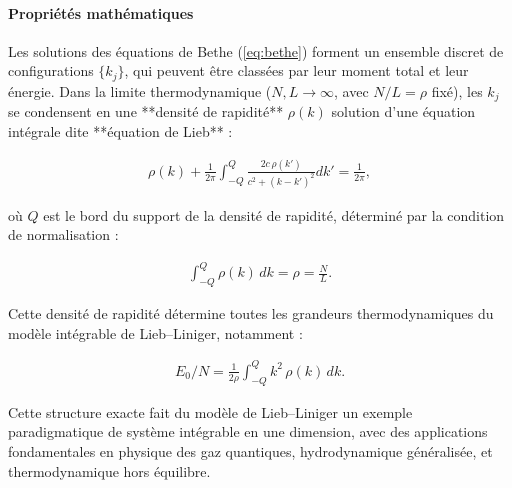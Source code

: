 \paragraph{Propriétés mathématiques}

Les solutions des équations de Bethe (\ref{eq:bethe}) forment un ensemble discret de configurations \(\{k_j\}\), qui peuvent être classées par leur moment total et leur énergie. Dans la limite thermodynamique (\(N, L \to \infty\), avec \(N/L = \rho\) fixé), les \(k_j\) se condensent en une **densité de rapidité** \(\rho(k)\) solution d’une équation intégrale dite **équation de Lieb** :

\begin{eqnarray}
	\rho(k) + \frac{1}{2\pi} \int_{-Q}^{Q} \frac{2c\, \rho(k')}{c^2 + (k - k')^2} dk' = \frac{1}{2\pi},
\end{eqnarray}

où \(Q\) est le bord du support de la densité de rapidité, déterminé par la condition de normalisation :

\begin{eqnarray}
	\int_{-Q}^{Q} \rho(k)\, dk = \rho = \frac{N}{L}.
\end{eqnarray}

Cette densité de rapidité détermine toutes les grandeurs thermodynamiques du modèle intégrable de Lieb–Liniger, notamment :

\begin{eqnarray}
	E_0/N = \frac{1}{2\rho} \int_{-Q}^{Q} k^2\, \rho(k)\, dk.
\end{eqnarray}

\vspace{1em}
Cette structure exacte fait du modèle de Lieb–Liniger un exemple paradigmatique de système intégrable en une dimension, avec des applications fondamentales en physique des gaz quantiques, hydrodynamique généralisée, et thermodynamique hors équilibre.
